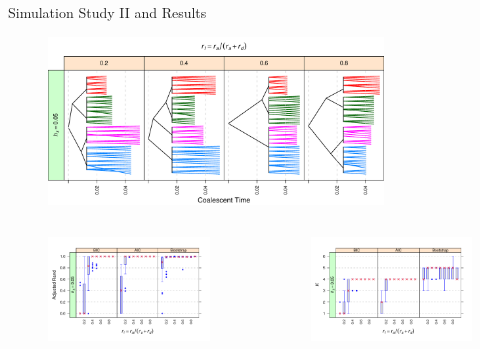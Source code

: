 \documentclass{beamer}
\begin{document}
\begin{frame}{Simulation Study II and Results}

\vspace{-0.1cm}
\begin{center}
\begin{figure}
  \includegraphics[width=3.5in]{./graph/ex_tree_b_sub}
\end{figure}

\vspace{-1.0cm}
\begin{columns}

\hspace{-0.7cm}
\begin{column}{0.5\textwidth}
\begin{figure}
  \includegraphics[width=2.5in]{./graph/simulation_b_1_sub}
\end{figure}
\end{column}

\hspace{-0.3cm}
\begin{column}{0.5\textwidth}
\begin{figure}
  \includegraphics[width=2.5in]{./graph/simulation_b_2_sub}
\end{figure}
\end{column}

\end{columns}
\end{center}

\end{frame}
\end{document}
